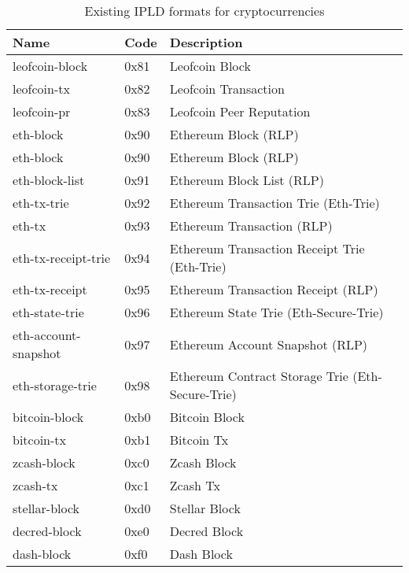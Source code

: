 \begin{table}[]
\centering
\begin{tabular}{|l|l|l|}
\hline
\textbf{Name}        & \textbf{Code} & \textbf{Description}                             \\ \hline
leofcoin-block       & 0x81          & Leofcoin Block                                   \\ \hline
leofcoin-tx          & 0x82          & Leofcoin Transaction                             \\ \hline
leofcoin-pr          & 0x83          & Leofcoin Peer Reputation                         \\ \hline
eth-block            & 0x90          & Ethereum Block (RLP)                             \\ \hline
eth-block            & 0x90          & Ethereum Block (RLP)                             \\ \hline
eth-block-list       & 0x91          & Ethereum Block List (RLP)                        \\ \hline
eth-tx-trie          & 0x92          & Ethereum Transaction Trie (Eth-Trie)             \\ \hline
eth-tx               & 0x93          & Ethereum Transaction (RLP)                       \\ \hline
eth-tx-receipt-trie  & 0x94          & Ethereum Transaction Receipt Trie (Eth-Trie)     \\ \hline
eth-tx-receipt       & 0x95          & Ethereum Transaction Receipt (RLP)               \\ \hline
eth-state-trie       & 0x96          & Ethereum State Trie (Eth-Secure-Trie)            \\ \hline
eth-account-snapshot & 0x97          & Ethereum Account Snapshot (RLP)                  \\ \hline
eth-storage-trie     & 0x98          & Ethereum Contract Storage Trie (Eth-Secure-Trie) \\ \hline
bitcoin-block        & 0xb0          & Bitcoin Block                                    \\ \hline
bitcoin-tx           & 0xb1          & Bitcoin Tx                                       \\ \hline
zcash-block          & 0xc0          & Zcash Block                                      \\ \hline
zcash-tx             & 0xc1          & Zcash Tx                                         \\ \hline
stellar-block        & 0xd0          & Stellar Block                                    \\ \hline
decred-block         & 0xe0          & Decred Block                                     \\ \hline
dash-block           & 0xf0          & Dash Block                                       \\ \hline
\end{tabular}
\caption{Existing IPLD formats for cryptocurrencies}
\label{ipldFormatsCrypto}
\end{table}
